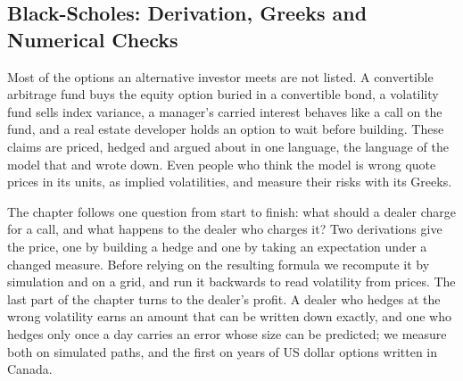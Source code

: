 
\begin{chapterrefs}
\setcounter{chapter}{4}
\chapter{Black-Scholes: Derivation, Greeks and Numerical Checks}
\label{ch:bs}

Most of the options an alternative investor meets are not listed. A convertible arbitrage fund buys
the equity option buried in a convertible bond, a volatility fund sells index variance, a manager's
carried interest behaves like a call on the fund, and a real estate developer holds an option to wait
before building. These claims are priced, hedged and argued about in one language, the language of the
model that \textcite{black1973} and \textcite{merton1973} wrote down. Even people who think the model
is wrong quote prices in its units, as implied volatilities, and measure their risks with its Greeks.

The chapter follows one question from start to finish: what should a dealer charge for a call, and
what happens to the dealer who charges it? Two derivations give the price, one by building a hedge and
one by taking an expectation under a changed measure. Before relying on the resulting formula we
recompute it by simulation and on a grid, and run it backwards to read volatility from prices. The
last part of the chapter turns to the dealer's profit. A dealer who hedges at the wrong volatility earns
an amount that can be written down exactly, and one who hedges only once a day carries an error whose
size can be predicted; we measure both on simulated paths, and the first on \fxYears{} years of US dollar
options written in Canada.


\end{chapterrefs}
